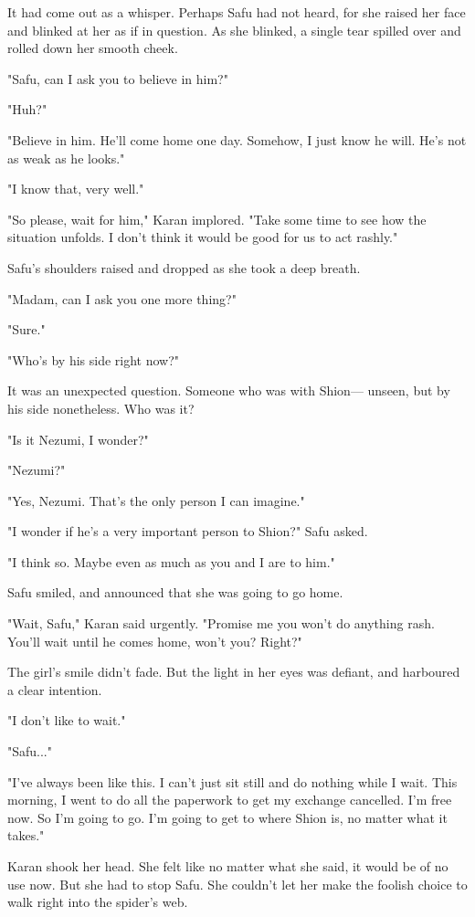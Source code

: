 It had come out as a whisper. Perhaps Safu had not heard, for she raised
her face and blinked at her as if in question. As she blinked, a single
tear spilled over and rolled down her smooth cheek.

"Safu, can I ask you to believe in him?"

"Huh?"

"Believe in him. He'll come home one day. Somehow, I just know he will.
He's not as weak as he looks."

"I know that, very well."

"So please, wait for him," Karan implored. "Take some time to see how
the situation unfolds. I don't think it would be good for us to act
rashly."

Safu's shoulders raised and dropped as she took a deep breath.

"Madam, can I ask you one more thing?"

"Sure."

"Who's by his side right now?"

It was an unexpected question. Someone who was with Shion--- unseen, but
by his side nonetheless. Who was it?

"Is it Nezumi, I wonder?"

"Nezumi?"

"Yes, Nezumi. That's the only person I can imagine."

"I wonder if he's a very important person to Shion?" Safu asked.

"I think so. Maybe even as much as you and I are to him."

Safu smiled, and announced that she was going to go home.

"Wait, Safu," Karan said urgently. "Promise me you won't do anything
rash. You'll wait until he comes home, won't you? Right?"

The girl's smile didn't fade. But the light in her eyes was defiant, and
harboured a clear intention.

"I don't like to wait."

"Safu..."

"I've always been like this. I can't just sit still and do nothing while
I wait. This morning, I went to do all the paperwork to get my exchange
cancelled. I'm free now. So I'm going to go. I'm going to get to where
Shion is, no matter what it takes."

Karan shook her head. She felt like no matter what she said, it would be
of no use now. But she had to stop Safu. She couldn't let her make the
foolish choice to walk right into the spider's web.

